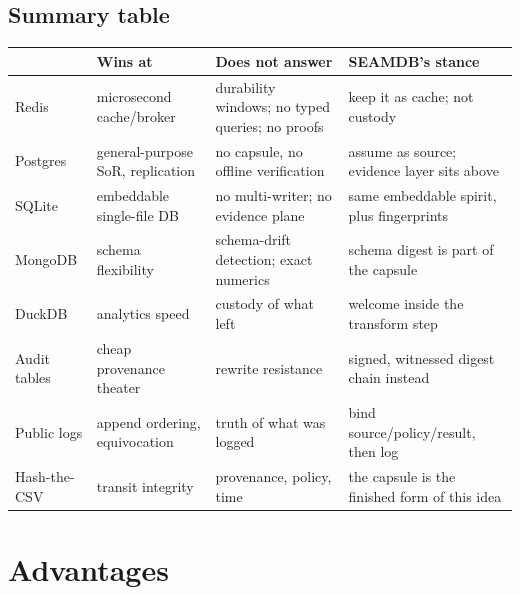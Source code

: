 \documentclass[11pt]{article}
\begin{document}
\subsection{Summary table}
\begin{center}
\small
\begin{tabular}{@{}p{2.9cm}p{3.6cm}p{3.4cm}p{3.6cm}@{}}
\toprule
& Wins at & Does not answer & SEAMDB's stance \\
\midrule
Redis & microsecond cache/broker & durability windows; no typed queries; no
  proofs & keep it as cache; not custody \\
Postgres & general-purpose SoR, replication & no capsule, no offline
  verification & assume as source; evidence layer sits above \\
SQLite & embeddable single-file DB & no multi-writer; no evidence plane &
  same embeddable spirit, plus fingerprints \\
MongoDB & schema flexibility & schema-drift detection; exact numerics &
  schema digest is part of the capsule \\
DuckDB & analytics speed & custody of what left & welcome inside the
  transform step \\
Audit tables & cheap provenance theater & rewrite resistance & signed,
  witnessed digest chain instead \\
Public logs & append ordering, equivocation & truth of what was logged &
  bind source/policy/result, then log \\
Hash-the-CSV & transit integrity & provenance, policy, time & the capsule
  is the finished form of this idea \\
\bottomrule
\end{tabular}
\end{center}

\section{Advantages}
\label{sec:advantages}
\end{document}

